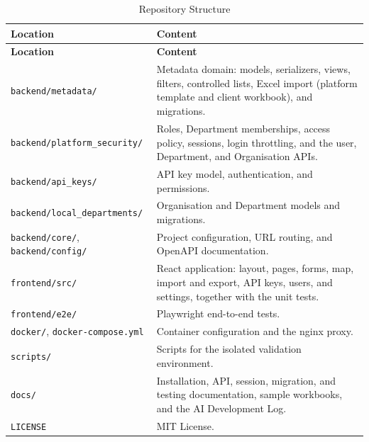 \documentclass[11pt,a4paper]{article}
\begin{document}
\begin{longtable}{P{5.2cm} P{9.9cm}}
\caption{Repository Structure}
\label{tab:phase3_structure}\\

\toprule
\textbf{Location} & \textbf{Content} \\
\midrule
\endfirsthead

\toprule
\textbf{Location} & \textbf{Content} \\
\midrule
\endhead

\bottomrule
\endfoot

\texttt{backend/metadata/} &
Metadata domain: models, serializers, views, filters, controlled lists,
Excel import (platform template and client workbook), and migrations. \\

\texttt{backend/platform\_security/} &
Roles, Department memberships, access policy, sessions, login
throttling, and the user, Department, and Organisation APIs. \\

\texttt{backend/api\_keys/} &
API key model, authentication, and permissions. \\

\texttt{backend/local\_departments/} &
Organisation and Department models and migrations. \\

\texttt{backend/core/}, \texttt{backend/config/} &
Project configuration, URL routing, and OpenAPI documentation. \\

\texttt{frontend/src/} &
React application: layout, pages, forms, map, import and export,
API keys, users, and settings, together with the unit tests. \\

\texttt{frontend/e2e/} &
Playwright end-to-end tests. \\

\texttt{docker/}, \texttt{docker-compose.yml} &
Container configuration and the nginx proxy. \\

\texttt{scripts/} &
Scripts for the isolated validation environment. \\

\texttt{docs/} &
Installation, API, session, migration, and testing documentation,
sample workbooks, and the AI Development Log. \\

\texttt{LICENSE} &
MIT License. \\

\end{longtable}
\end{document}
